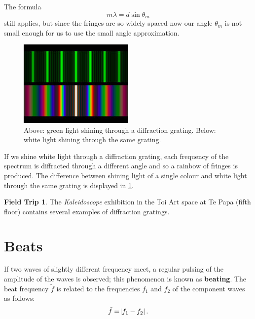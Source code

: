 \documentclass[a4paper]{amsbook}
\theoremstyle{definition}
\numberwithin{exercise}{chapter}
\numberwithin{exercise}{chapter}
\newtheorem{trip}[exercise]{Field Trip}
\begin{document}
The formula
\begin{displaymath}
  m \lambda = d \sin \theta_m
\end{displaymath}
still applies, but since the fringes are so widely spaced now our angle $ \theta_m $ is not small enough for us to use the small
angle approximation.

\begin{figure}
  \centering
  \includegraphics[width=0.5\textwidth]{whitediff}
  \caption{Above: green light shining through a diffraction grating. Below: white light shining through the same grating.}\label{fig:whitediff}
\end{figure}
If we shine white light through a diffraction grating, each frequency of the spectrum is diffracted through a different angle and
so a rainbow of fringes is produced. The difference between shining light of a single colour and white light through the same grating
is displayed in \cref{fig:whitediff}.

\begin{trip}
  The \textit{Kaleidoscope} exhibition in the Toi Art space at Te Papa (fifth floor) contains several examples of diffraction gratings.
\end{trip}

\section{Beats}
If two waves of slightly different frequency meet, a regular pulsing of the amplitude of the waves is observed; this phenomenon is
known as \textbf{beating}. The beat frequency $ \tilde{f} $ is related to the frequencies $ f_1 $ and $ f_2 $ of the component waves as follows:
\begin{equation}
  \tilde{f} = \abs{f_1 - f_2}.
\end{equation}
\end{document}
